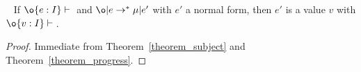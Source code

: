 



\begin{theorem}~\label{theorem_soundness}
If $\judgeewf \o {e : I}$ and $\o | e \to^* \mu | e'$ with $e'$ a normal form, then $e'$ is 
a value $v$ with $\judgeewf \o {v:I}$.
\end{theorem}
\begin{proof}
Immediate from Theorem~\ref{theorem_subject} and Theorem~\ref{theorem_progress}.
\end{proof}

